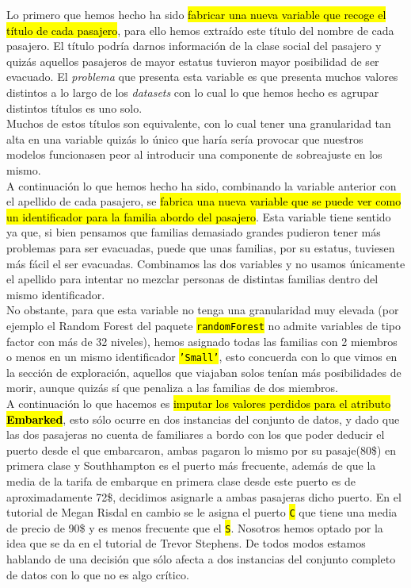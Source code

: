 \documentclass[10pt,a4paper]{article}
\newcommand{\emp}[1]{\sethlcolor{light-yellow}\hl{#1}} %
\newcommand{\code}[1]{\sethlcolor{rblue}\hl{\texttt{#1}}} %
\begin{document}
Lo primero que hemos hecho ha sido \emp{fabricar una nueva variable que recoge el título de cada pasajero}, para ello hemos extraído este título del nombre de cada pasajero. El título podría darnos información de la clase social del pasajero y quizás aquellos pasajeros de mayor estatus tuvieron mayor posibilidad de ser evacuado. El \textit{problema} que presenta esta variable es que presenta muchos valores distintos a lo largo de los \textit{datasets} con lo cual lo que hemos hecho es agrupar distintos títulos es uno solo.\\

Muchos de estos títulos son equivalente, con lo cual tener una granularidad tan alta en una variable quizás lo único que haría sería provocar que nuestros modelos funcionasen peor al introducir una componente de sobreajuste en los mismo.\\

A continuación lo que hemos hecho ha sido, combinando la variable anterior con el apellido de cada pasajero, se \emp{fabrica una nueva variable que se puede ver como un identificador para la familia abordo del pasajero}. Esta variable tiene sentido ya que, si bien pensamos que familias demasiado grandes pudieron tener más problemas para ser evacuadas, puede que unas familias, por su estatus, tuviesen más fácil el ser evacuadas. Combinamos las dos variables y no usamos únicamente el apellido para intentar no mezclar personas de distintas familias dentro del mismo identificador.\\

No obstante, para que esta variable no tenga una granularidad muy elevada (por ejemplo el Random Forest del paquete \code{randomForest} no admite variables de tipo factor con más de 32 niveles), hemos asignado todas las familias con 2 miembros o menos en un mismo identificador \code{'Small'}, esto concuerda con lo que vimos en la sección de exploración, aquellos que viajaban solos tenían más posibilidades de morir, aunque quizás sí que penaliza a las familias de dos miembros.\\

A continuación lo que hacemos es \emp{imputar los valores perdidos para el atributo \textbf{Embarked}}, esto sólo ocurre en dos instancias del conjunto de datos, y dado que las dos pasajeras no cuenta de familiares a bordo con los que poder deducir el puerto desde el que embarcaron, ambas pagaron lo mismo por su pasaje(80\$) en primera clase y Southhampton es el puerto más frecuente, además de que la media de la tarifa de embarque en primera clase desde este puerto es de aproximadamente 72\$, decidimos asignarle a ambas pasajeras dicho puerto. En el tutorial de Megan Risdal en cambio se le asigna el puerto \code{C} que tiene una media de precio de 90\$ y es menos frecuente que el \code{S}. Nosotros hemos optado por la idea que se da en el tutorial de Trevor Stephens. De todos modos estamos hablando de una decisión que sólo afecta a dos instancias del conjunto completo de datos con lo que no es algo crítico.\\
\end{document}

